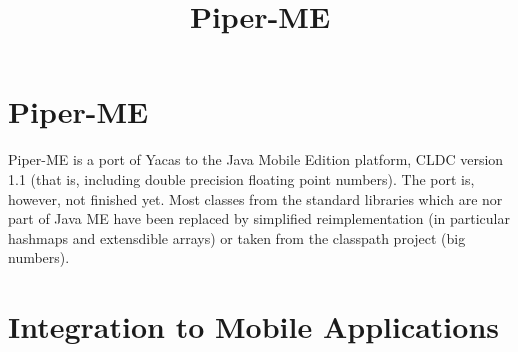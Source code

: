 

\newtheorem{atheorem}{Theorem}[section]
\newtheorem{adefinition}{Definition}[section]
\newtheorem{analgo}{Algorithm}[section]
\newtheorem{anexample}{Example}[section]

\newtheorem{acorollary}[atheorem]{Korollar}
\newtheorem{asubtheo}[atheorem]{Lemma}
\newtheorem{atinytheo}[atheorem]{Proposition}
\newcommand{\Path}{{\rm Path}}
\newcommand{\LO}{{\rm LO}}
\newcommand{\Abl}{\mbox{\rm Abl}}
\newcommand{\LAST}{{\rm fin}}
\newcommand{\DIST}{\mbox{\rm DIST}}
\newcommand{\Root}{{\rm root}}
\newcommand{\Front}{\mbox{\rm front}}
\newcommand{\KOST}{{\cal C}}
\newcommand{\Choose}{{\rm Choose}}
\newcommand{\Eword}{\Box}
\newcommand{\Pbegin}{{\rm\bf begin }}
\newcommand{\Pprocedure}{{\rm\bf procedure }}
\newcommand{\Pfunction}{{\rm\bf function }}
\newcommand{\Pinteger}{{\rm\bf integer}}
\newcommand{\Pend}{{\rm\bf end }}
\newcommand{\Pfor}{{\rm\bf for }}
\newcommand{\Pforall}{{\rm\bf for all }}
\newcommand{\Pendfor}{{\rm\bf endfor }}
\newcommand{\Pto}{{\rm\bf to }}
\newcommand{\Pdownto}{{\rm\bf downto }}
\newcommand{\Pdo}{{\rm\bf do }}
\newcommand{\Pif}{{\rm\bf if }}
\newcommand{\Pthen}{{\rm\bf then }}
\newcommand{\Pendif}{{\rm\bf endif }}
\newcommand{\Pelse}{{\rm\bf else }}
\newcommand{\Pendelse}{{\rm\bf endelse }}
\newcommand{\Preturn}{{\rm\bf return }}
\newcommand{\Real}{{\rm{I\hspace*{-0.4ex}R}}}
\newcommand{\Nat}{{\rm{I\hspace*{-0.4ex}N}}}
\newcommand{\Bool}{{\rm{I\hspace*{-0.4ex}B}}}
\newcommand{\Uint}{{\rm{I\hspace*{-0.5ex}I}}}
\newcommand{\Zet}{{\rm\sf Z\hspace*{-1.0ex}Z}}
\newcommand{\QuestEq}{\stackrel{?}{=}}
\newcommand{\DefEq}{:=}
\newcommand{\DisUnion}{\stackrel{.}{\cup}}
\newcommand{\IsPref}{\le_{\mbox{\tiny pr"af}}}


\title{
{\LARGE Piper-ME}\\
}

\maketitle

\chapter{Piper-ME}

Piper-ME is a port of Yacas to the Java Mobile Edition platform, CLDC version 1.1 
(that is, including double precision floating point numbers). The port is, however,
not finished yet. Most classes from the standard libraries which are nor part of
Java ME have been replaced by simplified reimplementation (in particular hashmaps
and extensdible arrays) or taken from the classpath project (big numbers).

\chapter{Integration to Mobile Applications}


